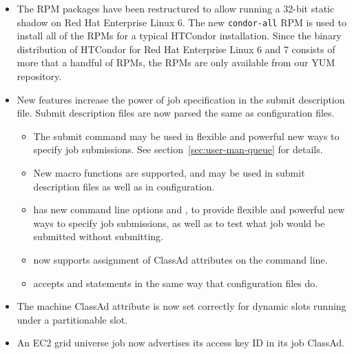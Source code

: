\begin{itemize}

\item The RPM packages have been restructured to allow running a 32-bit
static shadow on Red Hat Enterprise Linux 6. The new \texttt{condor-all}
RPM is used to install all of the RPMs for a typical HTCondor installation.
Since the binary distribution of HTCondor for Red Hat Enterprise Linux 6 and 7
consists of more that a handful of RPMs, the RPMs are only available from our
YUM repository.

\item New features increase the power of job specification
in the submit description file. 
Submit description files are now parsed the same as configuration files.

  \begin{itemize}
  \item The  submit command may be used in
flexible and powerful new ways to specify job submissions.
See section~\ref{sec:user-man-queue} for details.

  \item New macro functions are supported, 
and may be used in submit description files as well as in configuration.

  \item {} has new command line options  
and ,
to provide flexible and powerful new ways to specify job submissions,
as well as to test what job would be submitted without submitting.

  \item {} now supports assignment of ClassAd attributes
on the command line.

  \item {} accepts  and 
statements in the same way that configuration files do.

  \end{itemize}

\item The machine ClassAd attribute  is now set correctly
for dynamic slots running under a partitionable slot.

\item An EC2 grid universe job now advertises its access key ID in 
its job ClassAd.


\end{itemize}
